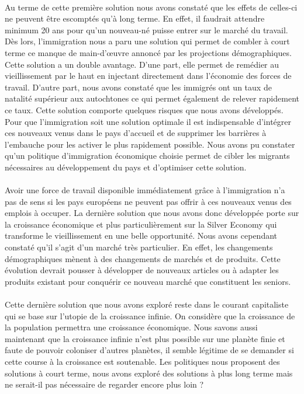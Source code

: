 \paragraph{}Au terme de cette première solution nous avons constaté que les effets de celles-ci ne peuvent être escomptés qu’à long terme. En effet, il faudrait attendre minimum 20 ans pour qu’un nouveau-né puisse entrer sur le marché du travail. Dès lors, l’immigration nous a paru une solution qui permet de combler à court terme ce manque de main-d’œuvre annoncé par les projections démographiques. Cette solution a un double avantage.  D’une part, elle permet de remédier au vieillissement par le haut en injectant directement dans l’économie des forces de travail. D’autre part, nous avons constaté que les immigrés ont un taux de natalité supérieur aux autochtones ce qui permet également de relever rapidement ce taux. Cette solution comporte quelques risques que nous avons développés. Pour que l’immigration soit une solution optimale il est indispensable d’intégrer ces nouveaux venus dans le pays d’accueil et de supprimer les barrières à l’embauche pour les activer le plus rapidement possible. Nous avons pu constater qu’un politique d’immigration économique choisie permet de cibler les migrants nécessaires au développement du pays et d’optimiser cette solution.
 
 
\paragraph{}Avoir une force de travail disponible immédiatement grâce à l’immigration n’a pas de sens si les pays européens ne peuvent pas offrir à ces nouveaux venus des emplois à occuper. La dernière solution que nous avons donc développée porte sur la croissance économique et plus particulièrement sur la Silver Economy qui transforme le vieillissement en une belle opportunité. Nous avons cependant constaté qu’il s’agit d’un marché très particulier. En effet, les changements démographiques mènent  à des changements de marchés et de produits. Cette évolution devrait pousser à développer de nouveaux articles ou à adapter les produits existant pour conquérir  ce nouveau marché que constituent les seniors.
 
\paragraph{}Cette dernière solution que nous avons exploré reste dans le courant capitaliste qui se base sur l'utopie de la croissance infinie. On considère que la croissance de la population permettra une croissance économique. Nous savons aussi maintenant que la croissance infinie n'est plus possible sur une planète finie et faute de pouvoir coloniser d'autres planètes, il semble légitime de se demander si cette course à la croissance est soutenable. Les politiques nous proposent des solutions à court terme, nous avons exploré des solutions à plus long terme mais ne serait-il pas nécessaire de regarder encore plus loin ? 